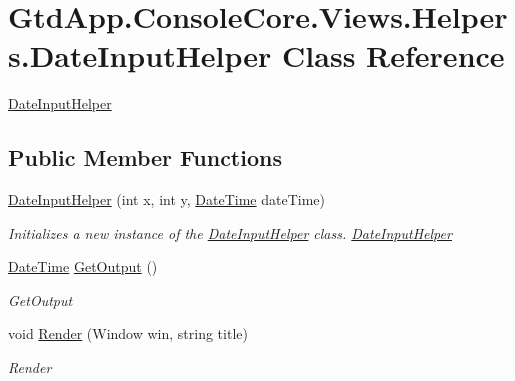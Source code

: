\hypertarget{class_gtd_app_1_1_console_core_1_1_views_1_1_helpers_1_1_date_input_helper}{}\section{Gtd\+App.\+Console\+Core.\+Views.\+Helpers.\+Date\+Input\+Helper Class Reference}
\label{class_gtd_app_1_1_console_core_1_1_views_1_1_helpers_1_1_date_input_helper}


\mbox{\hyperlink{class_gtd_app_1_1_console_core_1_1_views_1_1_helpers_1_1_date_input_helper}{Date\+Input\+Helper}}  


\subsection*{Public Member Functions}
\begin{DoxyCompactItemize}
\item 
\mbox{\hyperlink{class_gtd_app_1_1_console_core_1_1_views_1_1_helpers_1_1_date_input_helper_a2313afaa357dae151b047e457704fa38}{Date\+Input\+Helper}} (int x, int y, \mbox{\hyperlink{class_gtd_app_1_1_console_core_1_1_views_1_1_helpers_1_1_date_input_helper_a6ee8d5925335e46b70fde61da45aea1f}{Date\+Time}} date\+Time)
\begin{DoxyCompactList}\small\item\em Initializes a new instance of the \mbox{\hyperlink{class_gtd_app_1_1_console_core_1_1_views_1_1_helpers_1_1_date_input_helper}{Date\+Input\+Helper}} class. \mbox{\hyperlink{class_gtd_app_1_1_console_core_1_1_views_1_1_helpers_1_1_date_input_helper}{Date\+Input\+Helper}} \end{DoxyCompactList}\item 
\mbox{\hyperlink{class_gtd_app_1_1_console_core_1_1_views_1_1_helpers_1_1_date_input_helper_a6ee8d5925335e46b70fde61da45aea1f}{Date\+Time}} \mbox{\hyperlink{class_gtd_app_1_1_console_core_1_1_views_1_1_helpers_1_1_date_input_helper_a6c012b1dd1c3940a3f1ade53d871f57c}{Get\+Output}} ()
\begin{DoxyCompactList}\small\item\em Get\+Output \end{DoxyCompactList}\item 
void \mbox{\hyperlink{class_gtd_app_1_1_console_core_1_1_views_1_1_helpers_1_1_date_input_helper_af58cb594a87e74fa772c24a8290b964d}{Render}} (Window win, string title)
\begin{DoxyCompactList}\small\item\em Render \end{DoxyCompactList}\end{DoxyCompactItemize}
